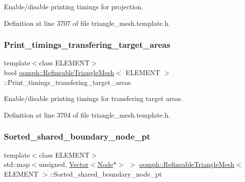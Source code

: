 Enable/disable printing timings for projection. 



Definition at line 3707 of file triangle\+\_\+mesh.\+template.\+h.

\mbox{\label{classoomph_1_1RefineableTriangleMesh_acd5c63891d8a4052ce629610697561b6}} 
\subsubsection{\texorpdfstring{Print\+\_\+timings\+\_\+transfering\+\_\+target\+\_\+areas}{Print\_timings\_transfering\_target\_areas}}
{\footnotesize\ttfamily template$<$class E\+L\+E\+M\+E\+NT$>$ \\
bool \hyperlink{classoomph_1_1RefineableTriangleMesh}{oomph\+::\+Refineable\+Triangle\+Mesh}$<$ E\+L\+E\+M\+E\+NT $>$\+::Print\+\_\+timings\+\_\+transfering\+\_\+target\+\_\+areas\hspace{0.3cm}{\ttfamily [protected]}}



Enable/disable printing timings for transfering target areas. 



Definition at line 3704 of file triangle\+\_\+mesh.\+template.\+h.

\mbox{\label{classoomph_1_1RefineableTriangleMesh_ab22bada72171b4403ce2424a3f36b0d3}} 
\subsubsection{\texorpdfstring{Sorted\+\_\+shared\+\_\+boundary\+\_\+node\+\_\+pt}{Sorted\_shared\_boundary\_node\_pt}}
{\footnotesize\ttfamily template$<$class E\+L\+E\+M\+E\+NT$>$ \\
std\+::map$<$unsigned, \hyperlink{classoomph_1_1Vector}{Vector}$<$\hyperlink{classoomph_1_1Node}{Node}$\ast$$>$ $>$ \hyperlink{classoomph_1_1RefineableTriangleMesh}{oomph\+::\+Refineable\+Triangle\+Mesh}$<$ E\+L\+E\+M\+E\+NT $>$\+::Sorted\+\_\+shared\+\_\+boundary\+\_\+node\+\_\+pt\hspace{0.3cm}{\ttfamily [protected]}}



